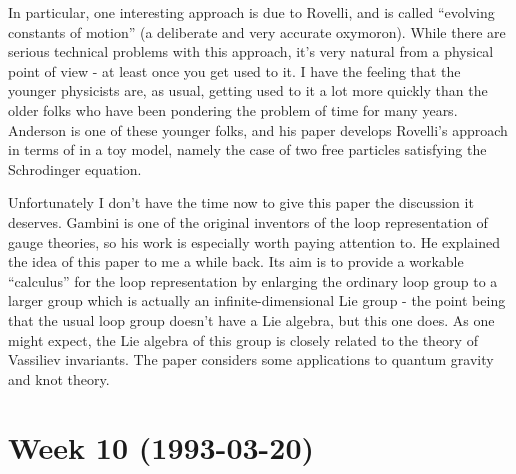 \documentclass{article}
\def\tightlist{}
\renewcommand{\texttt}[1]{%
  \begingroup
  \ttfamily
  \begingroup\lccode`~=`/\lowercase{\endgroup\def~}{/\discretionary{}{}{}}%
  \begingroup\lccode`~=`[\lowercase{\endgroup\def~}{[\discretionary{}{}{}}%
  \begingroup\lccode`~=`.\lowercase{\endgroup\def~}{.\discretionary{}{}{}}%
  \catcode`/=\active\catcode`[=\active\catcode`.=\active
  \scantokens{#1\noexpand}%
  \endgroup
}
\begin{document}

In particular, one interesting approach is due to Rovelli, and is called
``evolving constants of motion'' (a deliberate and very accurate
oxymoron). While there are serious technical problems with this
approach, it's very natural from a physical point of view - at least
once you get used to it. I have the feeling that the younger physicists
are, as usual, getting used to it a lot more quickly than the older
folks who have been pondering the problem of time for many years.
Anderson is one of these younger folks, and his paper develops Rovelli's
approach in terms of in a toy model, namely the case of two free
particles satisfying the Schrodinger equation.


Unfortunately I don't have the time now to give this paper the
discussion it deserves. Gambini is one of the original inventors of the
loop representation of gauge theories, so his work is especially worth
paying attention to. He explained the idea of this paper to me a while
back. Its aim is to provide a workable ``calculus'' for the loop
representation by enlarging the ordinary loop group to a larger group
which is actually an infinite-dimensional Lie group - the point being
that the usual loop group doesn't have a Lie algebra, but this one does.
As one might expect, the Lie algebra of this group is closely related to
the theory of Vassiliev invariants. The paper considers some
applications to quantum gravity and knot theory.
\hypertarget{week-10-1993-03-20}{%
\section{Week 10 (1993-03-20)}\label{week-10-1993-03-20}}
\end{document}
